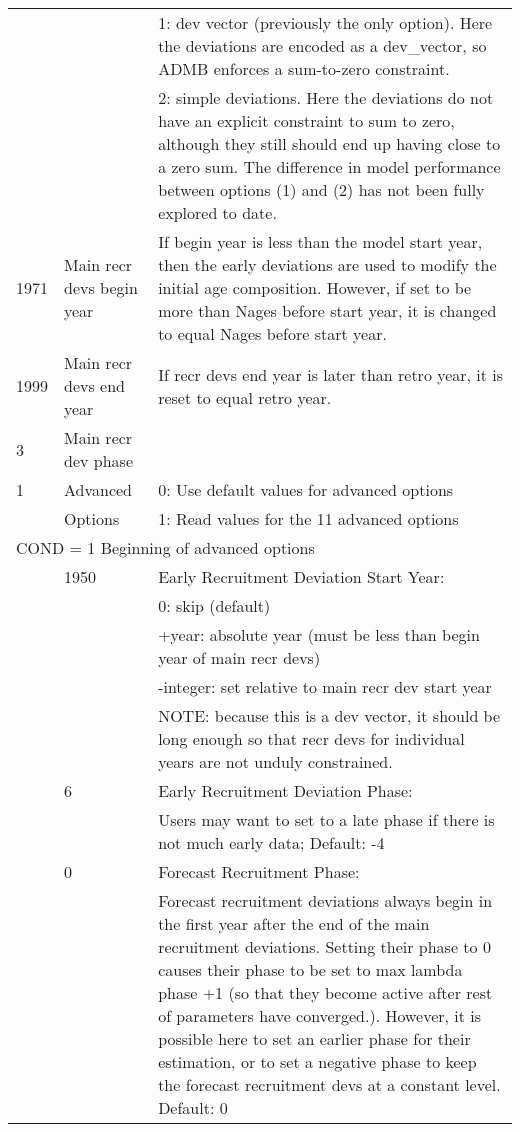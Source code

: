 \begin{center}
\begin{longtable}{p{1cm} p{3cm} p{11cm}}
		  &  & 1:  dev vector (previously the only option).  Here the deviations are encoded as a dev\_vector, so ADMB enforces a sum-to-zero constraint.\\
		  &  & 2:  simple deviations.  Here the deviations do not have an explicit constraint to sum to zero, although they still should end up having close to a zero sum.  The difference in model performance between options (1) and (2) has not been fully explored to date.\\
		\hline
		1971 & Main recr devs begin year & If begin year is less than the model start year, then the early deviations are used to modify the initial age composition.   However, if set to be more than Nages before start year, it is changed to equal Nages before start year. \\
		\hline
		1999 & Main recr devs end year & If recr devs end year is later than retro year, it is reset to equal retro year. \\
		\hline
		3    & Main recr dev phase & \\
		\hline
		1 & Advanced  & 0: Use default values for advanced options \\
		  & Options  & 1: Read values for the 11 advanced options \\
		\hline
		\multicolumn{3}{l}{COND = 1 Beginning of advanced options}\\
		& 1950 & Early Recruitment Deviation Start Year: \\
		&  & 0: skip (default) \\
		&  & +year:  absolute year (must be less than begin year of main  recr devs)\\
		&  & -integer:  set relative to main recr dev start year\\
		&  & NOTE:  because this is a dev vector, it should be long enough so that recr devs for individual years are not unduly constrained. \\
		& 6 & Early Recruitment Deviation Phase: \\
		& & Users may want to set to a late phase if there is not much early data; Default:  -4\\
		& 0 & Forecast Recruitment Phase: \\
		& & Forecast recruitment deviations always begin in the first year after the end of the main recruitment deviations.  Setting their phase to 0 causes their phase to be set to max lambda phase +1 (so that they become active after rest of parameters have converged.).  However, it is possible here to set an earlier phase for their estimation, or to set a negative phase to keep the forecast recruitment devs at a constant level. Default:  0 \\

\end{longtable}
\end{center}
